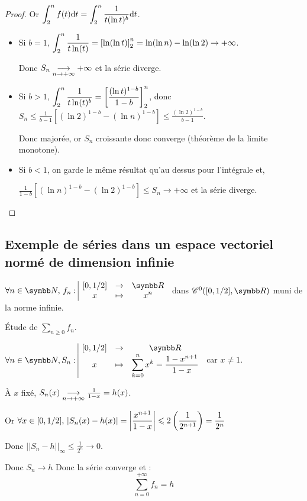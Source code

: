\begin{proof}
    Or $\displaystyle \int_{2}^{n} f(t) \text d t = \int_{2}^{n} \frac 1 {t (\ln t)^b} \text d t$.

    \begin{itemize}
        \item Si $b = 1$,
        $\displaystyle \int_2^n \frac 1 {t\ln(t)} = \left[ \ln(\ln t) \right]_{2}^{n} = \ln(\ln n) - \ln(\ln 2) \to + \infty$.
        
        Donc $S_n \underset{n \to + \infty}{\longrightarrow} + \infty$ et la série diverge.

        \item Si $b > 1$, 
        $\displaystyle \int_2^n \frac 1 {t\ln(t)^b} = \left[ \frac{(\ln t)^{1 - b}}{1 - b} \right]_{2}^{n}$, 
        donc $S_n \leqslant \frac 1 {b - 1} \left[ (\ln 2)^{1 - b} - (\ln n)^{1 - b} \right] \leqslant \frac{(\ln 2)^{1 - b}}{b - 1}$.

        Donc majorée, or $S_n$ croissante donc converge (théorème de la limite monotone).

        \item Si $b < 1$, on garde le même résultat qu'au dessus pour l'intégrale et,
        
        $\frac 1 {1 - b} \left[ (\ln n)^{1 - b} - (\ln 2)^{1 - b} \right] \leqslant S_n \to + \infty$
        et la série diverge. 
    \end{itemize}
\end{proof}

\subsection{Exemple de séries dans un espace vectoriel normé de dimension infinie}

$\forall n \in \N, \, \fonction{f_n}{[0, 1 / 2]}{\R}{x}{x^n}$ dans $\mathscr C^0([0, 1 / 2], \R)$ 
muni de la norme infinie. 

Étude de $\sum_{n \geqslant 0} f_n$.

\avspace $\forall n \in \N, \fonction{S_n}{[0, 1 / 2]} \R x {\sum_{k = 0}^n x^k = \frac{1 - x^{n + 1}}{1 - x}}$ car $x \neq 1$. 

\avspace À $x$ fixé, $S_n(x) \underset{n \to + \infty}{\longrightarrow} \frac 1 {1 - x} = h(x)$.

Or $\displaystyle \forall x \in [0, 1 / 2], \, \left|S_n(x) - h(x)\right| = \left|\frac{x^{n + 1}}{1 - x}\right| \leqslant 2 \left( \frac 1 {2^{n + 1}} \right) = \frac 1 {2^n}$

Donc $|| S_n - h ||_\infty \leqslant \frac 1 {2^n} \longrightarrow 0$.

Donc $S_n \longrightarrow h$ Donc la série converge et :
\[\sum_{n = 0}^{+\infty} f_n = h\]

